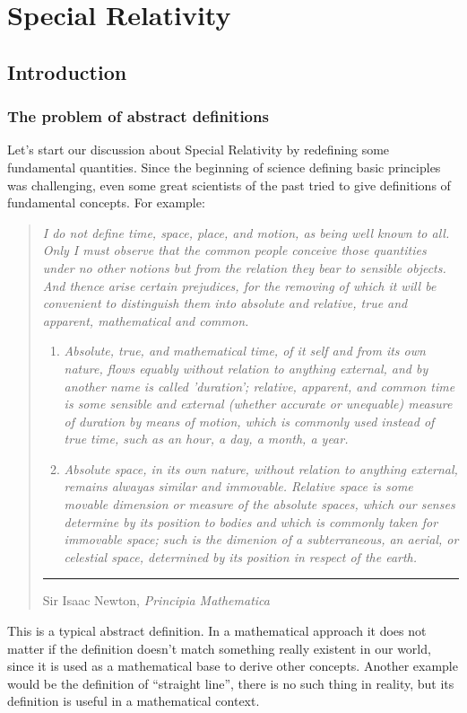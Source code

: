 \part{Special Relativity}
\chapter{Introduction}
\section{The problem of abstract definitions}
Let's start our discussion about Special Relativity by redefining some fundamental quantities. Since the beginning of science defining basic principles was challenging, even some great scientists of the past tried to give definitions of fundamental concepts. For example:
\begin{quotation}
  \noindent\textit{I do not define time, space, place, and motion, as being well known to all. Only I must observe that the common people conceive those quantities under no other notions but from the relation they bear to sensible objects. And thence arise certain prejudices, for the removing of which it will be convenient to distinguish them into absolute and relative, true and apparent, mathematical and common.}
  \begin{enumerate}
    \item \textit{Absolute, true, and mathematical time, of it self and from its own nature, flows equably without relation to anything external, and by another name is called 'duration'; relative, apparent, and common time is some sensible and external (whether accurate or unequable) measure of duration by means of motion, which is commonly used instead of true time, such as an hour, a day, a month, a year.}
    \item \textit{Absolute space, in its own nature, without relation to anything external, remains alwayas similar and immovable. Relative space is some movable dimension or measure of the absolute spaces, which our senses determine by its position to bodies and which is commonly taken for immovable space; such is the dimenion of a subterraneous, an aerial, or celestial space, determined by its position in respect of the earth.}
  \end{enumerate}
  \noindent\rule{\linewidth}{0.4pt}

  \hfill Sir Isaac Newton, \textit{Principia Mathematica}
\end{quotation}
This is a typical abstract definition. In a mathematical approach it does not matter if the definition doesn't match something really existent in our world, since it is used as a mathematical base to derive other concepts. Another example would be the definition of ``straight line'', there is no such thing in reality, but its definition is useful in a mathematical context.\\
